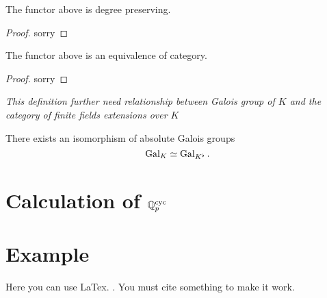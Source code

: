 \begin{theorem}
    \label{tilting_finite_degree_preserving}
    \notready

    The functor above is degree preserving.
\end{theorem}

\begin{proof}
    \notready

    sorry
\end{proof}

\begin{theorem}
    \label{tilting_finite_equivalence_of_category}
    \notready

    The functor above is an equivalence of category.
\end{theorem}

\begin{proof}
    \notready

    sorry
\end{proof}

\begin{definition}
    \label{Galois Isomorphism of Perfectoid Fields}
    \notready

    \emph{This definition further need relationship between Galois group of $K$ and the category of finite fields extensions over $K$}

    There exists an isomorphism of absolute Galois groups
    $$ \operatorname{Gal}_K \simeq \operatorname{Gal}_{K^\flat}.$$
\end{definition}

\section{Calculation of $\mathbb{Q}_p^{{\text{cyc}}}$}


\section{Example}
Here you can use LaTex. \cite{marcus}. You must cite something to make it work.


